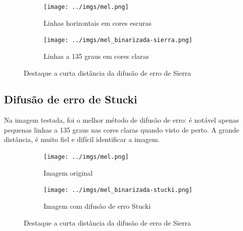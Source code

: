 \documentclass[brazilian,a4paper,twocolumn]{article}
\begin{document}
        \begin{figure}
            \centering
            \begin{subfigure}{0.24\textwidth}
                \texttt{[image: ../imgs/mel.png]}
                \caption{Linhas horizontais em cores escuras}
            \end{subfigure}
            \begin{subfigure}{0.24\textwidth}
                \texttt{[image: ../imgs/mel\_binarizada-sierra.png]}
                \caption{Linhas a 135 graus em cores claras}
            \end{subfigure}

            \caption{Destaque a curta distância da difusão de erro de Sierra}
            \label{fig:binarizada-sierra-destaque}
        \end{figure}

    \subsection{Difusão de erro de Stucki}

        Na imagem testada, foi o melhor método de difusão de erro: é notável apenas pequenas linhas a 135 graus nas cores claras quando visto de perto. A grande distância, é muito fiel e difícil identificar a imagem.

        \begin{figure}
            \centering
            \begin{subfigure}{0.24\textwidth}
                \texttt{[image: ../imgs/mel.png]}
                \caption{Imagem original}
            \end{subfigure}
            \begin{subfigure}{0.24\textwidth}
                \texttt{[image: ../imgs/mel\_binarizada-stucki.png]}
                \caption{Imagem com difusão de erro Stucki}
            \end{subfigure}

            \caption{Destaque a curta distância da difusão de erro de Sierra}
            \label{fig:binarizada-stucki}
        \end{figure}
\end{document}

